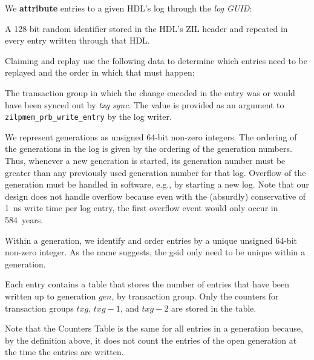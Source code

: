 \documentclass[12pt,a4paper,twoside]{book}
\begin{document}
We \textbf{attribute} entries to a given HDL's log through the \textit{log GUID}:
\begin{description}[noitemsep,leftmargin=1.5cm,labelindent=1cm]
    \item[Log GUID] A 128 bit random identifier stored in the HDL's ZIL header and repeated in every entry written through that HDL.
\end{description}

Claiming and replay use the following data to determine which entries need to be replayed and the order in which that must happen:
\begin{description}[noitemsep,leftmargin=1.5cm,labelindent=1cm]
    \item[Transaction Group (txg)] The transaction group in which the change encoded in the entry was or would have been synced out by \textit{txg sync}.
        The value is provided as an argument to \lstinline{zilpmem_prb_write_entry} by the log writer.
    \item[Generation Number (gen)] We represent generations as unsigned 64-bit non-zero integers.
        The ordering of the generations in the log is given by the ordering of the generation numbers.
        Thus, whenever a new generation is started, its generation number must be greater than any previously used generation number for that log.
        Overflow of the generation must be handled in software, e.g., by starting a new log.
        Note that our design does not handle overflow because even with the (absurdly) conservative of \SI{1}{ns} write time per log entry, the first overflow event would only occur in \SI{584}{years}.
    \item[Generation-Scoped ID (gsid)] Within a generation, we identify and order entries by a unique unsigned 64-bit non-zero integer.
        As the name suggests, the gsid only need to be unique within a generation.
    \item[Counters Table] Each entry contains a table that stores the number of entries that have been written up to generation $gen$, by transaction group.
        Only the counters for transaction groups $txg$, $txg - 1$, and $txg - 2$ are stored in the table.
\end{description}
Note that the Counters Table is the same for all entries in a generation because, by the definition above, it does not count the entries of the open generation at the time the entries are written.
\end{document}
